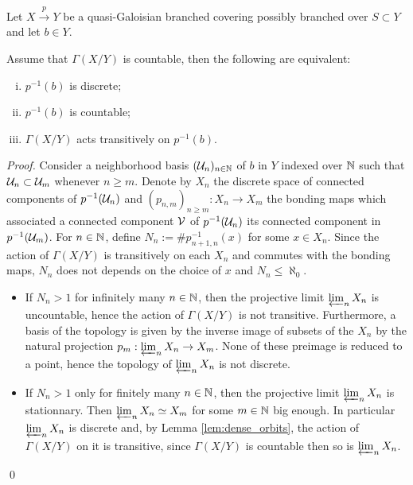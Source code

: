 \begin{lem} \label{lem:alternative_countable}
 Let $X\xrightarrow{p} Y$ be a quasi-Galoisian branched covering possibly branched over $S\subset Y$ and let $b\in Y$. 
 
 Assume that $\Gamma(X/Y)$ is countable, then the following are equivalent:
 \begin{enumerate}[(i)]
  \item $p^{-1}(b)$ is discrete;
  \item $p^{-1}(b)$ is countable;
  \item $\Gamma(X/Y)$ acts transitively on $p^{-1}(b)$.
 \end{enumerate}

\end{lem}
\begin{proof}
 Consider a neighborhood basis $(\mathcal{U}_n)_{n\in \mathbb{N}}$ of $b$ in $Y$ indexed over $\mathbb{N}$ such that $\mathcal{U}_n\subset \mathcal{U}_m$ whenever $n\geq m$. Denote by $X_n$ the discrete space of connected components of $p^{-1}(\mathcal{U}_n)$ and $(p_{n,m})_{n\geq m}: X_n \rightarrow X_m$ the bonding maps which associated a connected component $\mathcal V$ of $p^{-1}(\mathcal{U}_n)$
 its connected component in $p^{-1}(\mathcal{U}_m)$.
 For $n\in\mathbb{N}$, define $N_n := \#p_{n+1,n}^{-1}(x)$ for some $x\in X_n$. Since the action of $\Gamma(X/Y)$ is transitively on each $X_n$ and commutes with the bonding maps, $N_n$ does not depends on the choice of $x$ and $N_n\leq \aleph_0$.
 \begin{itemize}
  \item  If $N_n>1$ for infinitely many $n\in \mathbb{N}$, then the projective limit $\varprojlim_n X_n$ is uncountable, hence the action of $\Gamma(X/Y)$ is not transitive. Furthermore, a basis of the topology is given by the inverse image of   subsets of the $X_n$ by the natural projection $p_m : \varprojlim_n X_n \rightarrow X_m$. None of these preimage is reduced to a point, hence the topology of $\varprojlim_n X_n$ is not discrete.
  \item  If $N_n> 1$ only for finitely many $n\in \mathbb{N}$, then the projective limit  $\varprojlim_n X_n$ is  stationnary. Then $\varprojlim_n X_n \simeq X_m$ for some $m\in \mathbb{N}$ big enough. In particular $\varprojlim_n X_n$ is discrete and, by Lemma \ref{lem:dense_orbits}, the action of $\Gamma(X/Y)$ on it is transitive, since $\Gamma(X/Y)$ is countable then so is $\varprojlim_n X_n$. 
 \end{itemize}
\qed\end{proof}


